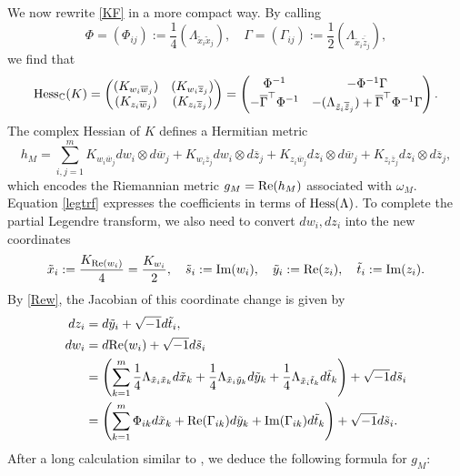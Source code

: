 \documentclass[11pt,reqno]{amsart}
\newcommand{\C}{\mathbb{C}}
\theoremstyle{plain}
\theoremstyle{definition}
\numberwithin{equation}{section}
\begin{document}
We now rewrite \eqref{KF} in a more compact way. By calling
$$\Phi=(\Phi_{ij}):=\frac{1}{4}(\Lambda_{\tilde{x}_{i}\tilde{x}_{j}}) ,\quad  \Gamma=(\Gamma_{ij}):=\frac{1}{2}(\Lambda_{\tilde{x}_{i}\overline{\tilde{z}}_{j}}),$$
we find that
\begin{align}
{\rm Hess}_{\C}(K)  = \begin{pmatrix}
     (K_{w_{i}\overline{w}_{j}})  & (K_{w_{i}\overline{z}_{j}})  \\
     (K_{z_{i}\overline{w}_{j}})  & (K_{z_{i}\overline{z}_{j}})
    \end{pmatrix}
     =  \begin{pmatrix}
   \Phi^{-1}  & -\Phi^{-1}\Gamma   \\
   - \overline{\Gamma}^{\top}\Phi^{-1}  & -(\Lambda_{\tilde{z}_{i}\overline{\tilde{z}}_{j}}) +\overline{\Gamma}^{\top} \Phi^{-1} \Gamma
\end{pmatrix}.\label{legtrf}
   \end{align}
The complex Hessian of $K$ defines a Hermitian metric
$$h_M=\sum_{i,j=1}^{m} K_{w_{i}\overline{w}_j}dw_{i}\otimes d\overline{w}_j+K_{w_{i}\overline{z}_j}dw_{i}\otimes d\overline{z}_j+K_{z_{i}\overline{w}_j}dz_{i}\otimes d\overline{w}_j+K_{z_{i}\overline{z}_j}dz_{i}\otimes d\overline{z}_j,$$
which encodes the Riemannian metric $g_M= {\rm Re}(h_M)$ associated with $\omega_M$. 
Equation \eqref{legtrf} expresses the coefficients in terms of ${\rm Hess}(\Lambda)$. To complete the partial Legendre transform, we also need to convert $dw_i, dz_i$ into the new coordinates
$$\tilde{x}_{i}:= \frac{K_{{\rm Re}(w_i)}}{4} =\frac{K_{w_{i}}}{2},\quad   \tilde{s}_{i}:=\mathrm{Im}(w_{i})  ,\quad  \tilde{y}_{i}:=\mathrm{Re}(z_{i}) ,\quad  \tilde{t}_{i}:=\mathrm{Im}(z_{i}).$$
By \eqref{Rew}, the Jacobian of this coordinate change is given by
\begin{align*}
dz_i & =  d\tilde{y}_i + \sqrt{-1}d\tilde{t}_i,\\
dw_i & =  d{\rm Re}(w_i) + \sqrt{-1}d\tilde{s}_i\nonumber\\
& =  \left(\sum_{k=1}^m \frac{1}{4}\Lambda_{\tilde{x}_i\tilde{x}_k}d\tilde{x}_k + \frac{1}{4}\Lambda_{\tilde{x}_{i}\tilde{y}_{k}}d\tilde{y}_{k}+\frac{1}{4}\Lambda_{\tilde{x}_{i}\tilde{t}_{k}}d\tilde{t}_{k}  \right)+ \sqrt{-1}d\tilde{s}_i\nonumber\\
 & =  \left(\sum_{k=1}^m \Phi_{ik}d\tilde{x}_{k} + {\rm Re}(\Gamma_{ik})d\tilde{y}_{k}+{\rm Im}(\Gamma_{ik})d\tilde{t}_{k} \right)+ \sqrt{-1}d\tilde{s}_i .
\end{align*}
After a long calculation similar to \cite[Eq. 3.13--3.19]{PP}, we deduce the following formula for $g_M$:
\end{document}
